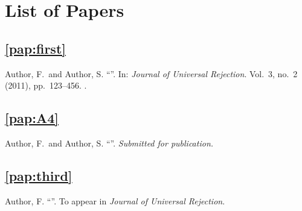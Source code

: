 \chapter{List of Papers}


\section*{\cref{pap:first}}
Author, F.\ and Author, S.
\enquote{}.
In: \emph{Journal of Universal Rejection}.
Vol.\ 3,
no.\ 2
(2011),
pp.~123--456.
.

\section*{\cref{pap:A4}}
Author, F.\ and Author, S.
\enquote{}.
\emph{Submitted for publication.}

\section*{\cref{pap:third}}
Author, F.
\enquote{}.
To appear in \emph{Journal of Universal Rejection}.